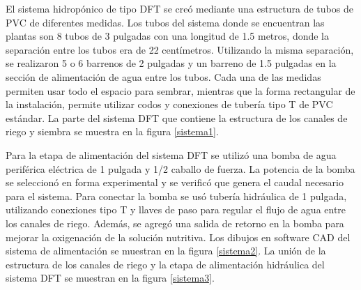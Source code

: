 El sistema hidropónico de tipo DFT se creó mediante una estructura de tubos de PVC de diferentes medidas. Los tubos del sistema donde se encuentran las plantas son 8 tubos de 3 pulgadas con una longitud de 1.5 metros, donde la separación entre los tubos era de 22 centímetros. Utilizando la misma separación, se realizaron 5 o 6 barrenos de 2 pulgadas y un barreno de 1.5 pulgadas en la sección de alimentación de agua entre los tubos. Cada una de las medidas permiten usar todo el espacio para sembrar, mientras que la forma rectangular de la instalación, permite utilizar codos y conexiones de tubería tipo T de PVC estándar. La parte del sistema DFT que contiene la estructura de los canales de riego y siembra se muestra en la figura \ref{sistema1}.

Para la etapa de alimentación del sistema DFT se utilizó una bomba de agua periférica eléctrica de 1 pulgada y 1/2 caballo de fuerza. La potencia de la bomba se seleccionó en forma experimental y se verificó que genera el caudal necesario para  el sistema. Para conectar la bomba se usó tubería hidráulica de 1 pulgada, utilizando conexiones tipo T y llaves de paso para regular el flujo de agua entre los canales de riego. Además, se agregó una salida de retorno en la bomba para mejorar la oxigenación de la solución nutritiva. Los dibujos en software CAD del sistema de alimentación se muestran en la figura \ref{sistema2}. La unión de la estructura de los canales de riego y la etapa de alimentación hidráulica del sistema DFT se muestran en la figura \ref{sistema3}.

